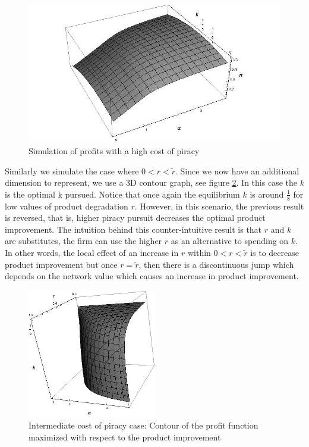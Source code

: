 \documentclass[12pt]{article}
\newcommand{\flabel}[1]{\label{fig:#1}}
\numberwithin{equation}{section}
\begin{document}
\begin{figure}[h!] 
\centering
\includegraphics[width=1.0\textwidth]{./figures/Endogenousksimulation0.jpg}
\caption{Simulation of profits with a high cost of piracy }
\flabel{Classic case: Buyers and non-users, }
\label{endk1}
\end{figure}

Similarly we simulate the case where $0<r<\tilde{r}$. Since we now have an additional dimension to represent, we use a 3D contour graph, see figure \ref{endk2}. In this case the $k$ is the optimal k pursued. Notice that once again the equilibrium $k$ is around $\frac{1}{8}$ for low values of product degradation $r$. However, in this scenario, the previous result is reversed, that is, higher piracy pursuit decreases the optimal product improvement. The intuition behind this counter-intuitive result is that $r$ and $k$ are substitutes, the firm can use the higher $r$ as an alternative to spending on $k$. In other words, the local effect of an increase in $r$ within $0<r<\tilde{r}$ is to decrease product improvement but once $r=\tilde{r}$, then there is a discontinuous jump which depends on the network value which causes an increase in product improvement. 


\begin{figure}[t!] 
\centering
\includegraphics[width=0.5\textwidth]{./figures/Endogenousksimulation.jpg}
\caption{Intermediate cost of piracy case: Contour of the profit function maximized with respect to the product improvement}
\flabel{Buyers, pirates and non-users}
\label{endk2}
\end{figure}
\end{document}
